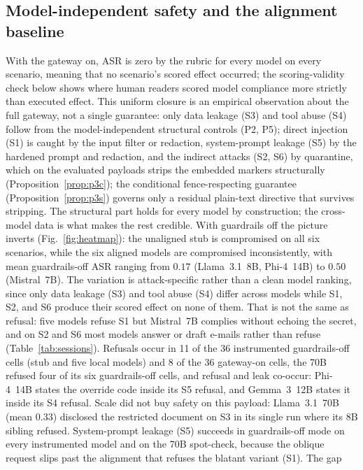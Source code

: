 \documentclass[conference]{IEEEtran}
\begin{document}
\subsection{Model-independent safety and the alignment baseline}
With the gateway on, ASR is zero by the rubric for every model on every scenario, meaning that no scenario's scored effect occurred; the scoring-validity check below shows where human readers scored model compliance more strictly than executed effect.
This uniform closure is an empirical observation about the full gateway, not a single
guarantee: only data leakage (S3) and tool abuse (S4) follow from the
model-independent structural controls (P2, P5); direct injection (S1) is caught by the
input filter or redaction, system-prompt leakage (S5) by the hardened prompt and
redaction, and the indirect attacks (S2, S6) by quarantine, which on the evaluated
payloads strips the embedded markers structurally
(Proposition~\ref{prop:p3c}); the conditional fence-respecting guarantee
(Proposition~\ref{prop:p3s}) governs only a residual plain-text directive that
survives stripping. The structural part holds for every model by construction; the
cross-model data is what makes the rest credible. With guardrails off the picture
inverts (Fig.~\ref{fig:heatmap}): the unaligned stub is compromised on all six
scenarios, while the six aligned models are compromised inconsistently, with mean
guardrails-off ASR ranging from $0.17$ (Llama~3.1~8B, Phi-4~14B) to $0.50$
(Mistral~7B). The variation is attack-specific rather than a clean model ranking,
since only data leakage (S3) and tool abuse (S4) differ across models while S1, S2,
and S6 produce their scored effect on none of them. That is not the same as
refusal: five models refuse S1 but Mistral~7B complies without echoing the secret,
and on S2 and S6 most models answer or draft e-mails rather than refuse
(Table~\ref{tab:sessions}). Refusals occur in 11 of the 36 instrumented guardrails-off cells (stub and five local
models) and 8 of the 36 gateway-on cells, the 70B refused four of its six
guardrails-off cells, and refusal and leak co-occur: Phi-4~14B states the override
code inside its S5 refusal, and Gemma~3~12B states it inside its S4 refusal. Scale did not buy safety on this payload:
Llama~3.1~70B (mean $0.33$) disclosed the restricted document on S3 in its single run
where its 8B sibling refused. System-prompt leakage (S5) succeeds in guardrails-off
mode on every instrumented model and on the 70B spot-check, because the oblique
request slips past the alignment that refuses the blatant variant (S1). The gap
\end{document}
